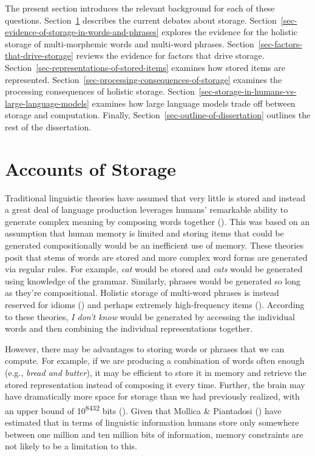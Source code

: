 \documentclass[
  12pt,
  letterpaper,
]{scrreprt}
\begin{document}
The present section introduces the relevant background for each of these
questions. Section~\ref{sec-accounts-of-storage} describes the current
debates about storage.
Section~\ref{sec-evidence-of-storage-in-words-and-phrases} explores the
evidence for the holistic storage of multi-morphemic words and
multi-word phrases. Section~\ref{sec-factors-that-drive-storage} reviews
the evidence for factors that drive storage.
Section~\ref{sec-representations-of-stored-items} examines how stored
items are represented.
Section~\ref{sec-processing-consequences-of-storage} examines the
processing consequences of holistic storage.
Section~\ref{sec-storage-in-humans-vs-large-language-models} examines
how large language models trade off between storage and computation.
Finally, Section~\ref{sec-outline-of-dissertation} outlines the rest of
the dissertation.

\section{Accounts of Storage}\label{sec-accounts-of-storage}

Traditional linguistic theories have assumed that very little is stored
and instead a great deal of language production leverages humans'
remarkable ability to generate complex meaning by composing words
together (). This was based on
an assumption that human memory is limited and storing items that could
be generated compositionally would be an inefficient use of memory.
These theories posit that stems of words are stored and more complex
word forms are generated via regular rules. For example, \emph{cat}
would be stored and \emph{cats} would be generated using knowledge of
the grammar. Similarly, phrases would be generated so long as they're
compositional. Holistic storage of multi-word phrases is instead
reserved for idioms () and
perhaps extremely high-frequency items (). According to these theories, \emph{I don't know}
would be generated by accessing the individual words and then combining
the individual representations together.

However, there may be advantages to storing words or phrases that we can
compute. For example, if we are producing a combination of words often
enough (e.g., \emph{bread and butter}), it may be efficient to store it
in memory and retrieve the stored representation instead of composing it
every time. Further, the brain may have dramatically more space for
storage than we had previously realized, with an upper bound of
10\textsuperscript{8432} bits
().
Given that Mollica \& Piantadosi
() have estimated
that in terms of linguistic information humans store only somewhere
between one million and ten million bits of information, memory
constraints are not likely to be a limitation to this.
\end{document}
